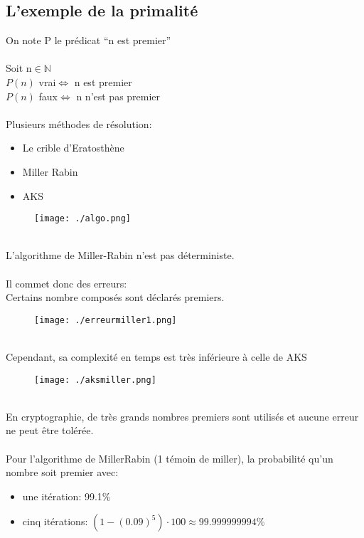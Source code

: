 \documentclass[12pt]{article}   %
\begin{document}
\subsection{L'exemple de la primalité}
On note P le prédicat "`n est premier"'
\\\\Soit n\begin{math}\in\mathbb{N}\end{math}
\\\begin{math}P(n)\end{math} vrai\begin{math}\Longleftrightarrow\end{math}  n est premier
\\\begin{math}P(n)\end{math} faux\begin{math}\Longleftrightarrow \end{math} n n'est pas premier
\\\\Plusieurs méthodes de résolution:
\begin{itemize}
	\item Le crible d’Eratosthène
	\item Miller Rabin
	\item AKS
\end{itemize}
\begin{figure}[htbp]
	\centering
		\texttt{[image: ./algo.png]}
	\label{fig:algo}
\end{figure}
~\\L'algorithme de Miller-Rabin n'est pas déterministe.
\\\\Il commet donc des erreurs:\\Certains nombre composés sont déclarés premiers.
\begin{figure}[htbp]
	\centering
		\texttt{[image: ./erreurmiller1.png]}
	\label{fig:erreurmiller1}
\end{figure}
\newpage
~\\Cependant, sa complexité en temps est très inférieure à celle de AKS
\begin{figure}[htbp]
	\centering
		\texttt{[image: ./aksmiller.png]}
	\label{fig:aksmiller}
\end{figure}
~\\En cryptographie, de très grands nombres premiers sont utilisés et aucune erreur ne peut être tolérée. \\\\Pour l'algorithme de MillerRabin (1 témoin de miller), la probabilité qu'un nombre soit premier avec:
\begin{itemize}
	\item une itération: 99.1\%
	\item cinq itérations: \begin{math}(1-(0.09)^5)\cdot100\approx99.999999994\%\end{math}
\end{itemize}
\end{document}
